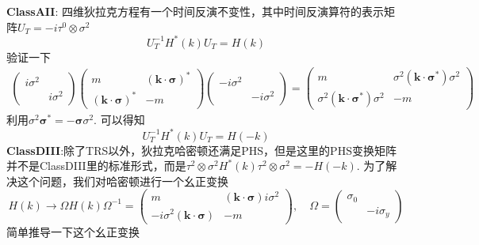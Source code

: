 \documentclass[a4paper]{article}
\numberwithin{equation}{subsection}
\begin{document}
\textbf{ClassAII}: 四维狄拉克方程有一个时间反演不变性，其中时间反演算符的表示矩阵$U_T=-i\tau^0\otimes\sigma^2$
\begin{equation}
    U_T^{-1}H^*(k)U_T=H(k)
\end{equation}
验证一下
\begin{equation*}
    \begin{split}
        \begin{pmatrix}i\sigma^2&\\
        &i\sigma^2\end{pmatrix}\begin{pmatrix}
            m&(\bm{k}\cdot\bm{\sigma})^*\\
            (\bm{k}\cdot\bm{\sigma})^*&-m
        \end{pmatrix}\begin{pmatrix}
            -i\sigma^2&\\
            &-i\sigma^2
        \end{pmatrix}=\begin{pmatrix}
            m&\sigma^2(\bm{k}\cdot\bm{\sigma}^*)\sigma^2\\
            \sigma^2(\bm{k}\cdot\bm{\sigma}^*)\sigma^2&-m
        \end{pmatrix}
    \end{split}
\end{equation*}
利用$\sigma^2\bm{\sigma}^*=-\bm{\sigma}\sigma^2$. 可以得知
\begin{equation*}
    U_T^{-1}H^*(k)U_T=H(-k)
\end{equation*}
\textbf{ClassDIII}:除了TRS以外，狄拉克哈密顿还满足PHS，但是这里的PHS变换矩阵并不是ClassDIII里的标准形式，而是$\tau^2\otimes\sigma^2H^*(k)\tau^2\otimes\sigma^2=-H(-k)$. 为了解决这个问题，我们对哈密顿进行一个幺正变换
\begin{equation}
    H(k)\rightarrow\Omega H(k)\Omega^{-1}=\begin{pmatrix}
        m&(\bm{k}\cdot\bm{\sigma})i\sigma^2\\
        -i\sigma^2(\bm{k}\cdot\bm{\sigma})&-m
    \end{pmatrix},\quad \Omega=\begin{pmatrix}
        \sigma_0&\\
        &-i\sigma_y
    \end{pmatrix}
\end{equation}
简单推导一下这个幺正变换
\end{document}

